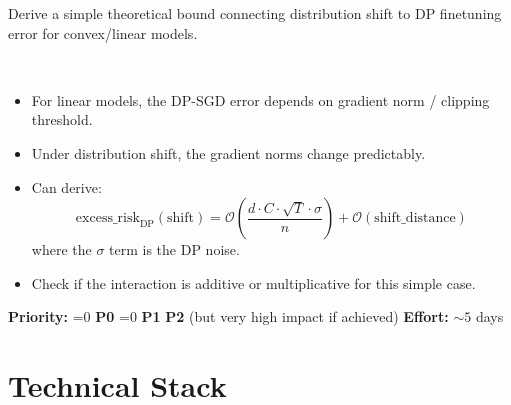 \documentclass[11pt,a4paper]{article}
\newcommand{\ptag}[1]{%
    \ifnum\pdfstrcmp{#1}{P0}=0
        {\textcolor{p0color}{\textbf{P0}}}%
    \else\ifnum\pdfstrcmp{#1}{P1}=0
        {\textcolor{p1color}{\textbf{P1}}}%
    \else
        {\textcolor{p2color}{\textbf{P2}}}%
    \fi\fi
}
\begin{document}
\begin{description}[nosep]
    \item[Motivation:] Derive a simple theoretical bound connecting distribution shift to DP finetuning error for convex/linear models.
    \item[Approach:] ~
\end{description}
\begin{itemize}[nosep]
    \item For linear models, the DP-SGD error depends on gradient norm / clipping threshold.
    \item Under distribution shift, the gradient norms change predictably.
    \item Can derive:
    \begin{equation}
        \text{excess\_risk}_{\text{DP}}(\text{shift}) = \mathcal{O}\!\left(\frac{d \cdot C \cdot \sqrt{T} \cdot \sigma}{n}\right) + \mathcal{O}(\text{shift\_distance})
    \end{equation}
    where the $\sigma$ term is the DP noise.
    \item Check if the interaction is additive or multiplicative for this simple case.
\end{itemize}
\textbf{Priority:} \ptag{P2} (but very high impact if achieved) \quad \textbf{Effort:} ${\sim}5$ days

\section{Technical Stack}
\end{document}
